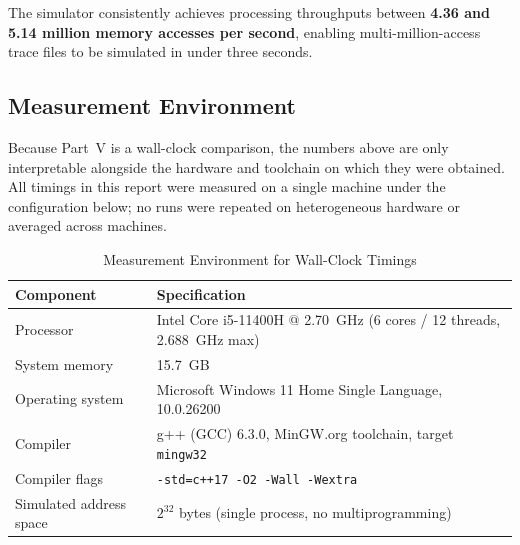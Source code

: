\documentclass[11pt,a4paper]{article}
\begin{document}
\begin{table}[h]
\centering
\caption{Part V Simulator Wall-Clock Performance and Throughput}
\label{tab:part5_timing}
\end{table}

The simulator consistently achieves processing throughputs between \textbf{4.36 and 5.14 million memory accesses per second}, enabling multi-million-access trace files to be simulated in under three seconds.

\subsection{Measurement Environment}
\label{sec:env}
Because Part~V is a wall-clock comparison, the numbers above are only interpretable alongside the hardware and toolchain on which they were obtained. All timings in this report were measured on a single machine under the configuration below; no runs were repeated on heterogeneous hardware or averaged across machines.

\begin{table}[h]
\centering
\caption{Measurement Environment for Wall-Clock Timings}
\label{tab:measurement_env}
\begin{tabular}{ll}
\toprule
\textbf{Component} & \textbf{Specification} \\
\midrule
Processor & Intel Core i5-11400H @ 2.70~GHz (6 cores / 12 threads, 2.688~GHz max) \\
System memory & 15.7~GB \\
Operating system & Microsoft Windows 11 Home Single Language, 10.0.26200 \\
Compiler & g++ (GCC) 6.3.0, MinGW.org toolchain, target \texttt{mingw32} \\
Compiler flags & \texttt{-std=c++17 -O2 -Wall -Wextra} \\
Simulated address space & $2^{32}$ bytes (single process, no multiprogramming) \\
\bottomrule
\end{tabular}
\end{table}
\end{document}
